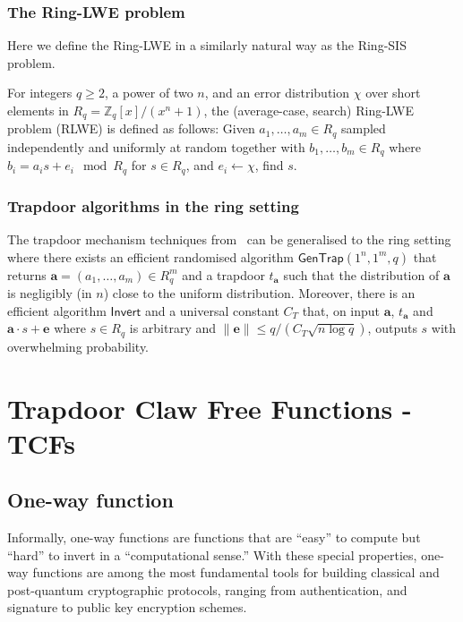 \documentclass[cryptography,review,submit,pdftex,moreauthors,amsmath,amssymb,aps,strict]{Definitions/mdpi}
\begin{document}
\subsubsection{The Ring-LWE problem}
Here we define the Ring-LWE in a similarly natural way as the Ring-SIS problem.

For integers $q\geq 2$, a power of two $n$, and an error distribution $\chi$ over short elements in $R_q = \mathbb{Z}_q[x]/(x^n+1)$, the (average-case, search) Ring-LWE problem (RLWE) is defined as follows: 
Given $a_1,\dots, a_{m}\in R_q$ sampled independently and uniformly at random together with $b_1,\dots,b_{m}\in R_q$ where $b_i=a_i s + e_i \mod R_q$ for $s\in R_q$, and $e_i\gets \chi$, find $s$.



\subsubsection{Trapdoor algorithms in the ring setting}

The trapdoor mechanism techniques from~\cite{MP12} can be generalised to the ring setting where there exists an efficient randomised algorithm $\mathsf{GenTrap}(1^n,1^m,q)$ that returns $\mathbf{a}=(a_1,\dots,a_m)\in R^{m}_q$ and a trapdoor $t_{\mathbf{a}}$ such that the distribution of $\mathbf{a}$ is negligibly (in $n$) close to the uniform distribution. Moreover, there is an efficient algorithm $\mathsf{Invert}$ and a universal constant $C_T$ that, on input $\mathbf{a}$, $t_{\mathbf{a}}$ and $\mathbf{a}\cdot s+\mathbf{e}$ where $s \in R_q$ is arbitrary and $\|\mathbf{e}\|\leq q/(C_T\sqrt{n\log q})$, outputs $s$ with overwhelming probability.

\section{Trapdoor Claw Free Functions - TCFs} \label{tfcs}

\subsection{One-way function}
Informally, one-way functions are functions that are ``easy'' to compute but ``hard'' to invert in a ``computational sense.'' With these special properties, one-way functions are among the most fundamental tools for building classical and post-quantum cryptographic protocols, ranging from authentication, and signature to public key encryption schemes. 
\end{document}

